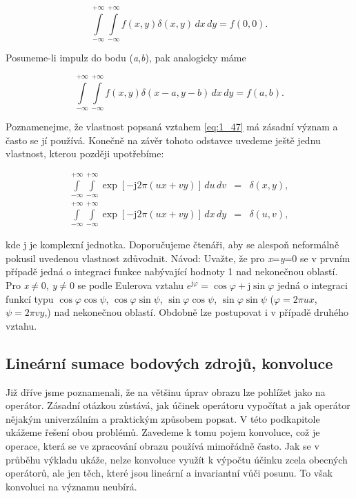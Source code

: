 \begin{equation} \label{eq:1_46}
    \int\limits_{-\infty}^{+\infty} \int\limits_{-\infty}^{+\infty} f(x, y) \delta(x, y)\, dx\, dy = f(0, 0).
\end{equation}

Posuneme-li impulz do bodu (\textit{a},\textit{b}), pak analogicky máme

\begin{equation} \label{eq:1_47}
    \int\limits_{-\infty}^{+\infty} \int\limits_{-\infty}^{+\infty} f(x, y) \delta(x-a, y-b)\, dx\, dy = f(a, b).
\end{equation}

Poznamenejme, že vlastnost popsaná vztahem \eqref{eq:1_47} má zásadní význam a často se jí používá. Konečně na závěr tohoto odstavce uvedeme ještě jednu vlastnost, kterou později upotřebíme:

\begin{eqnarray} \label{eq:1_48}
    \int\limits_{-\infty}^{+\infty} \int\limits_{-\infty}^{+\infty} \exp \left[ -\mathrm{j} 2 \pi \left(ux + vy\right) \right] \, du\, dv &=& \delta(x, y), \\
    \int\limits_{-\infty}^{+\infty} \int\limits_{-\infty}^{+\infty} \exp \left[ -\mathrm{j} 2 \pi \left( ux + vy \right) \right] \,dx \,dy &=& \delta(u, v),\nonumber
\end{eqnarray}

kde j je komplexní jednotka. Doporučujeme čtenáři, aby se alespoň neformálně pokusil uvedenou vlastnost zdůvodnit. Návod: Uvažte, že pro \textit{x}=\textit{y}=0 se v prvním případě jedná o integraci funkce nabývající hodnoty 1 nad nekonečnou oblastí. Pro \textit{x}$\neq$0, \textit{y}$\neq$0 se podle Eulerova vztahu $e^{\mathrm{j}\varphi} = \cos\varphi + \mathrm{j} \sin\varphi$ jedná o integraci funkcí typu $\cos\varphi\cos\psi$, $\cos\varphi\sin\psi$, $\sin\varphi\cos\psi$, $\sin\varphi\sin\psi$ ($\varphi=2\pi ux$, $\psi=2\pi vy$,) nad nekonečnou oblastí. Obdobně lze postupovat i v případě druhého vztahu.

\subsection*{Lineární sumace bodových zdrojů, konvoluce}

Již dříve jsme poznamenali, že na většinu úprav obrazu lze pohlížet jako na operátor.
Zásadní otázkou zůstává, jak účinek operátoru vypočítat a jak operátor nějakým univerzálním a praktickým způsobem popsat.
V této podkapitole ukážeme řešení obou problémů.
Zavedeme k tomu pojem konvoluce, což je operace, která se ve zpracování obrazu používá mimořádně často.
Jak se v průběhu výkladu ukáže, nelze konvoluce využít k výpočtu účinku zcela obecných operátorů,
ale jen těch, které jsou lineární a invariantní vůči posunu.
To však konvoluci na významu neubírá.

